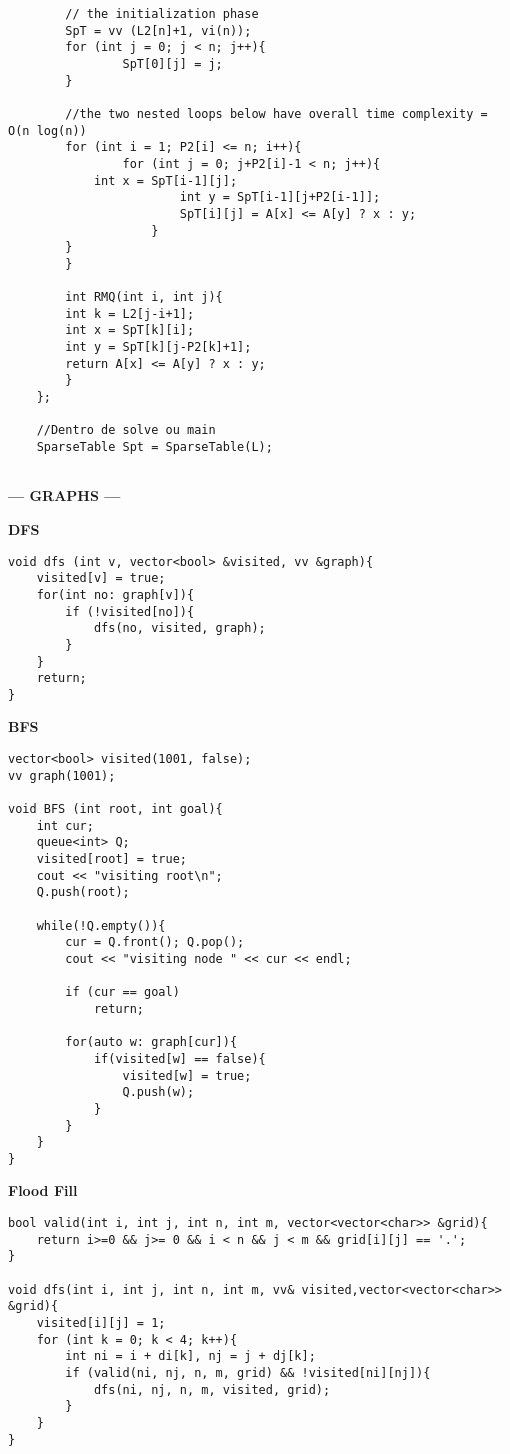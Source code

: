 \documentclass{article}
\begin{document}
\begin{multicols}{2}
\begin{lstlisting}
		// the initialization phase
		SpT = vv (L2[n]+1, vi(n));
		for (int j = 0; j < n; j++){
				SpT[0][j] = j;
		}
	
		//the two nested loops below have overall time complexity = O(n log(n))
		for (int i = 1; P2[i] <= n; i++){
				for (int j = 0; j+P2[i]-1 < n; j++){
			int x = SpT[i-1][j];
						int y = SpT[i-1][j+P2[i-1]];
						SpT[i][j] = A[x] <= A[y] ? x : y;
					}
		}
		}
		
		int RMQ(int i, int j){
		int k = L2[j-i+1];
		int x = SpT[k][i];
		int y = SpT[k][j-P2[k]+1];
		return A[x] <= A[y] ? x : y;
		}
	};
	
	//Dentro de solve ou main
	SparseTable Spt = SparseTable(L);
	  
\end{lstlisting}

\large
\begin{center}
\huge\textbf{--- GRAPHS ---}
\end{center}
\large

\large
\huge\textbf{DFS}
\large
\begin{lstlisting}
void dfs (int v, vector<bool> &visited, vv &graph){
	visited[v] = true;
	for(int no: graph[v]){
		if (!visited[no]){
			dfs(no, visited, graph);
		}
	}
	return;
}
\end{lstlisting}

\large
\huge\textbf{BFS}
\large
\begin{lstlisting}
vector<bool> visited(1001, false);
vv graph(1001);

void BFS (int root, int goal){
	int cur;
	queue<int> Q;
	visited[root] = true;
	cout << "visiting root\n";
	Q.push(root);

	while(!Q.empty()){
		cur = Q.front(); Q.pop();
		cout << "visiting node " << cur << endl; 

		if (cur == goal)
			return;

		for(auto w: graph[cur]){
			if(visited[w] == false){
				visited[w] = true;
				Q.push(w);
			}
		}
	}
}
\end{lstlisting}

\large
\huge\textbf{Flood Fill}
\large
\begin{lstlisting}
bool valid(int i, int j, int n, int m, vector<vector<char>> &grid){
	return i>=0 && j>= 0 && i < n && j < m && grid[i][j] == '.';
}

void dfs(int i, int j, int n, int m, vv& visited,vector<vector<char>> &grid){
	visited[i][j] = 1;
	for (int k = 0; k < 4; k++){
		int ni = i + di[k], nj = j + dj[k];
		if (valid(ni, nj, n, m, grid) && !visited[ni][nj]){
			dfs(ni, nj, n, m, visited, grid);
		}
	}
}


\end{lstlisting}
\end{multicols}
\end{document}
